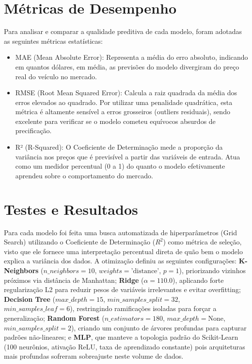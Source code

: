 \documentclass[conference]{IEEEtran}
\begin{document}
	\section{Métricas de Desempenho}

		Para analisar e comparar a qualidade preditiva de cada modelo, foram adotadas as seguintes métricas estatísticas:

		\begin{itemize}
			\item MAE (Mean Absolute Error): Representa a média do erro absoluto, indicando em quantos dólares, em média, as previsões do modelo divergiram do preço real do veículo no mercado.
			\item RMSE (Root Mean Squared Error): Calcula a raiz quadrada da média dos erros elevados ao quadrado. Por utilizar uma penalidade quadrática, esta métrica é altamente sensível a erros grosseiros (outliers residuais), sendo excelente para verificar se o modelo cometeu equívocos absurdos de precificação.
			\item R² (R-Squared): O Coeficiente de Determinação mede a proporção da variância nos preços que é previsível a partir das variáveis de entrada. Atua como um medidor percentual (0 a 1) do quanto o modelo efetivamente aprendeu sobre o comportamento do mercado.
		\end{itemize}

	\section{Testes e Resultados}

		Para cada modelo foi feita uma busca automatizada de hiperparâmetros (Grid Search) utilizando o Coeficiente de Determinação ($R^2$) como métrica de seleção, visto que ele fornece uma interpretação percentual direta de quão bem o modelo explica a variância dos dados. A otimização definiu as seguintes configurações: \textbf{K-Neighbors} ($n\_neighbors=10$, $weights=\text{'distance'}$, $p=1$), priorizando vizinhos próximos via distância de Manhattan; \textbf{Ridge} ($\alpha=110.0$), aplicando forte regularização L2 para reduzir pesos de variáveis irrelevantes e evitar overfitting; \textbf{Decision Tree} ($max\_depth=15$, $min\_samples\_split=32$, $min\_samples\_leaf=6$), restringindo ramificações isoladas para forçar a generalização; \textbf{Random Forest} ($n\_estimators=180$, $max\_depth=\text{None}$, $min\_samples\_split=2$), criando um conjunto de árvores profundas para capturar padrões não-lineares; e \textbf{MLP}, que manteve a topologia padrão do Scikit-Learn (100 neurônios, ativação ReLU, taxa de aprendizado constante) pois arquiteturas mais profundas sofreram sobreajuste neste volume de dados.
\end{document}

